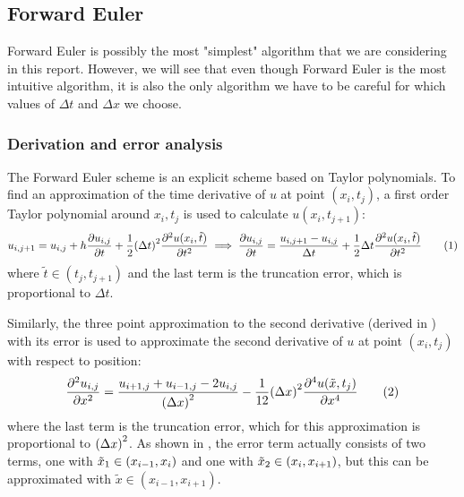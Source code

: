 
%
\subsection{Forward Euler}
Forward Euler is possibly the most "simplest" algorithm that we are considering in this report. However, we will see that even though Forward Euler is the most intuitive algorithm, it is also the only algorithm we have to be careful for which values of \(\Delta t\) and \(\Delta x\) we choose.
\subsubsection{Derivation and error analysis}\label{sec:ForwardEulerDerivation}
The Forward Euler scheme is an explicit scheme based on Taylor polynomials. To find an approximation of the time derivative of \(u\) at point \((x_i,t_j)\), a first order Taylor polynomial around \(x_i,t_j\) is used to calculate \(u(x_i,t_{j+1})\):
\[
    u_{i,j+1} = u_{i,j} + h\pdv{u_{i,j}}{t} + \frac{1}{2}\qty(\Delta t)^2\pdv[2]{u(x_i,\tilde{t})}{t}
    \implies \pdv{u_{i,j}}{t} = \frac{u_{i,j+1}-u_{i,j}}{\Delta t} + \frac{1}{2}\Delta t\pdv[2]{u(x_i,\tilde{t})}{t}\eqtag{asymmnewton}
\]
where \(\tilde{t}\in(t_j,t_{j+1})\) and the last term is the truncation error, which is proportional to \(\Delta t\).

Similarly, the three point approximation to the second derivative (derived in \autocite{oblig1}) with its error is used to approximate the second derivative of \(u\) at point \((x_i,t_j)\) with respect to position:
\[
    \pdv[2]{u_{i,j}}{x} = \frac{u_{i+1,j} + u_{i-1,j} - 2u_{i,j}}{\qty(\Delta x)^2} - \frac{1}{12}\qty(\Delta x)^2\pdv[4]{u(\tilde{x},t_j)}{x}\eqtag{andrederivert}
\]
where the last term is the truncation error, which for this approximation is proportional to \(\qty(\Delta x)^2\). As shown in \autocite{oblig1}, the error term actually consists of two terms, one with \(\tilde{x}_1\in\qty(x_{i-1},x_i)\) and one with \(\tilde{x}_2\in\qty(x_i,x_{i+1})\), but this can be approximated with \(\tilde{x}\in(x_{i-1},x_{i+1})\).

